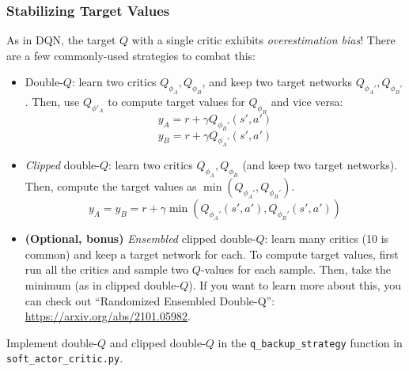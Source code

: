 \subsubsection{Stabilizing Target Values}
As in DQN, the target $Q$ with a single critic exhibits \textit{overestimation bias}! There are a few commonly-used strategies to combat this:
\begin{itemize}
    \item Double-$Q$: learn two critics $Q_{\phi_A}, Q_{\phi_B}$, and keep two target networks $Q_{\phi_A'}, Q_{\phi_B'}$. Then, use $Q_{\phi'_A}$ to compute target values for $Q_{\phi_B}$ and vice versa:
    \[y_A = r + \gamma Q_{\phi_B'}(s', a')\]
    \[y_B = r + \gamma Q_{\phi_A'}(s', a')\]
    \item \textit{Clipped} double-$Q$: learn two critics $Q_{\phi_A}, Q_{\phi_B}$ (and keep two target networks). Then, compute the target values as $\min(Q_{\phi_A'}, Q_{\phi_B'})$.
    \[y_A = y_B = r + \gamma \min\left(Q_{\phi_A'}(s', a'), Q_{\phi_B'}(s', a')\right)\]
    \item \textbf{(Optional, bonus)} \textit{Ensembled} clipped double-$Q$: learn many critics (10 is common) and keep a target network for each. To compute target values, first run all the critics and sample two $Q$-values for each sample. Then, take the minimum (as in clipped double-$Q$). If you want to learn more about this, you can check out ``Randomized Ensembled Double-Q'': \url{https://arxiv.org/abs/2101.05982}.
\end{itemize}
Implement double-$Q$ and clipped double-$Q$ in the \verb|q_backup_strategy| function in \verb|soft_actor_critic.py|.

